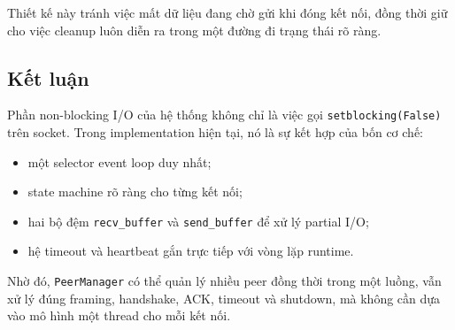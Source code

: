 Thiết kế này tránh việc mất dữ liệu đang chờ gửi khi đóng kết nối, đồng thời giữ cho việc cleanup luôn diễn ra trong một đường đi trạng thái rõ ràng.

\subsection{Kết luận}
Phần non-blocking I/O của hệ thống không chỉ là việc gọi \texttt{setblocking(False)} trên socket. Trong implementation hiện tại, nó là sự kết hợp của bốn cơ chế:
\begin{itemize}[leftmargin=2em]
    \item một selector event loop duy nhất;
    \item state machine rõ ràng cho từng kết nối;
    \item hai bộ đệm \texttt{recv\_buffer} và \texttt{send\_buffer} để xử lý partial I/O;
    \item hệ timeout và heartbeat gắn trực tiếp với vòng lặp runtime.
\end{itemize}

Nhờ đó, \texttt{PeerManager} có thể quản lý nhiều peer đồng thời trong một luồng, vẫn xử lý đúng framing, handshake, ACK, timeout và shutdown, mà không cần dựa vào mô hình một thread cho mỗi kết nối.
